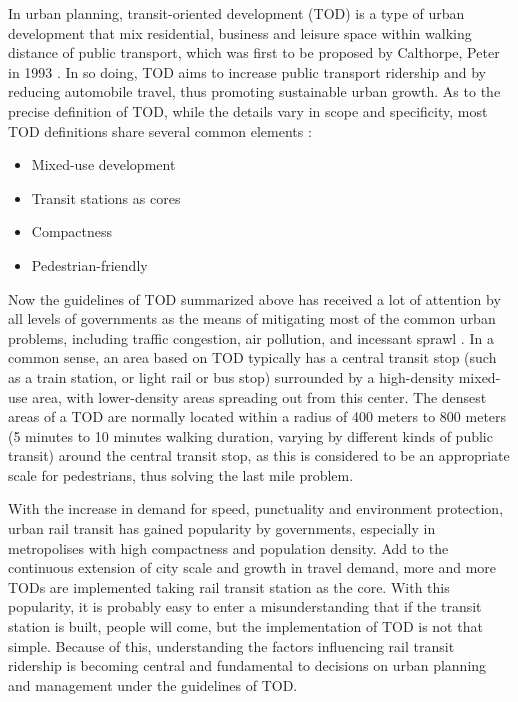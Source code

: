 In urban planning, transit-oriented development (TOD) is a type of urban development that mix residential, business and leisure space within walking distance of public transport, which was first to be proposed by Calthorpe, Peter in 1993 \cite{calthorpe1993next}. In so doing, TOD aims to increase public transport ridership and by reducing automobile travel, thus promoting sustainable urban growth. As to the precise definition of TOD, while the details vary in scope and specificity, most TOD definitions share several common elements \cite{boarnet1997story,bernick1997transit,megally2001california,cervero2004transit}:

\begin{itemize}
	\item Mixed-use development
	\item Transit stations as cores
	\item Compactness
	\item Pedestrian-friendly
\end{itemize}

% 
Now the guidelines of TOD summarized above has received a lot of attention by all levels of governments as the means of mitigating most of the common urban problems, including traffic congestion, air pollution, and incessant sprawl \cite{cervero2002transit}. In a common sense, an area based on TOD typically has a central transit stop (such as a train station, or light rail or bus stop) surrounded by a high-density mixed-use area, with lower-density areas spreading out from this center. The densest areas of a TOD are normally located within a radius of 400 meters to 800 meters (5 minutes to 10 minutes walking duration, varying by different kinds of public transit) around the central transit stop, as this is considered to be an appropriate scale for pedestrians, thus solving the last mile problem. 

With the increase in demand for speed, punctuality and environment protection, urban rail transit has gained popularity by governments, especially in metropolises with high compactness and population density. Add to the continuous extension of city scale and growth in travel demand, more and more TODs are implemented taking rail transit station as the core. With this popularity, it is probably easy to enter a misunderstanding that if the transit station is built, people will come, but the implementation of TOD is not that simple. Because of this, understanding the factors influencing rail transit ridership is becoming central and fundamental to decisions on urban planning and management under the guidelines of TOD. 

